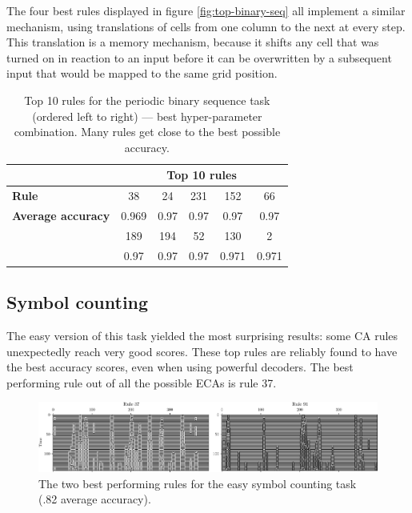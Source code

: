 The four best rules displayed in figure \ref{fig:top-binary-seq} all implement a
similar mechanism, using translations of cells from one column to the next at
every step. This translation is a memory mechanism, because it shifts any cell
that was turned on in reaction to an input before it can be overwritten by a
subsequent input that would be mapped to the same grid position.

\begin{table}[htbp]
  \centering
    \begin{tabular}{p{4cm}ccccc}
      \toprule
      & \multicolumn{5}{c}{\bfseries Top 10 rules}\\
      \midrule
      \bfseries Rule & 38 & 24 & 231 & 152 & 66 \\
      \bfseries Average accuracy & 0.969 & 0.97 & 0.97 & 0.97 & 0.97 \\
      \midrule
      \hrulefill & 189 & 194 & 52 & 130 & 2 \\
      \hrulefill & 0.97 & 0.97 & 0.97 & 0.971 & 0.971\\
      \bottomrule
    \end{tabular}
  \caption{Top 10 rules for the periodic binary sequence task (ordered left to
    right) --- best hyper-parameter combination. Many rules get close to the best
    possible accuracy.}\label{tab:top_periodic_rules}
\end{table}

\subsection{Symbol counting}

The easy version of this task yielded the most surprising results: some CA rules
unexpectedly reach very good scores. These top rules are reliably found to have
the best accuracy scores, even when using powerful decoders. The best performing
rule out of all the possible \acp{ECA} is rule 37.

\begin{figure}[htbp]
  \centering
  \includegraphics[width=\linewidth]{figures/rules-sym-ct.pdf}
  \caption{The two best performing rules for the easy symbol counting task (.82
    average accuracy).}\label{fig:best_sym_ct}
\end{figure}

